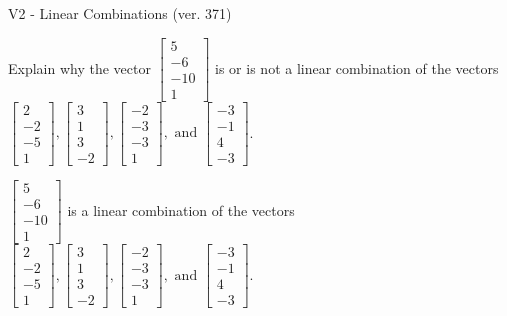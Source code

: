 \begin{exercise}
  \begin{exerciseTitle}V2 - Linear Combinations (ver. 371)\end{exerciseTitle}
  \begin{exerciseStatement}
    Explain why the vector \(\left[\begin{array}{c}
5 \\
-6 \\
-10 \\
1
\end{array}\right]\)  is or is not a linear 
	combination of the vectors \(\left[\begin{array}{c}
2 \\
-2 \\
-5 \\
1
\end{array}\right] , \left[\begin{array}{c}
3 \\
1 \\
3 \\
-2
\end{array}\right] , \left[\begin{array}{c}
-2 \\
-3 \\
-3 \\
1
\end{array}\right] , \text{ and } \left[\begin{array}{c}
-3 \\
-1 \\
4 \\
-3
\end{array}\right]\).
	


  \end{exerciseStatement}
  \begin{exerciseAnswer}
   \(\left[\begin{array}{c}
5 \\
-6 \\
-10 \\
1
\end{array}\right]\) 
  	 is  
	a linear combination of the vectors \(\left[\begin{array}{c}
2 \\
-2 \\
-5 \\
1
\end{array}\right] , \left[\begin{array}{c}
3 \\
1 \\
3 \\
-2
\end{array}\right] , \left[\begin{array}{c}
-2 \\
-3 \\
-3 \\
1
\end{array}\right] , \text{ and } \left[\begin{array}{c}
-3 \\
-1 \\
4 \\
-3
\end{array}\right]\).


\end{exerciseAnswer}
\end{exercise}
